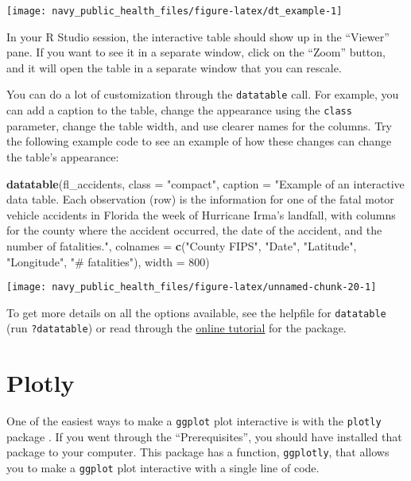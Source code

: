 \documentclass[]{tufte-book}
\newenvironment{Shaded}{}{}
\newcommand{\DataTypeTok}[1]{\textcolor[rgb]{0.56,0.13,0.00}{#1}}
\newcommand{\DecValTok}[1]{\textcolor[rgb]{0.25,0.63,0.44}{#1}}
\newcommand{\KeywordTok}[1]{\textcolor[rgb]{0.00,0.44,0.13}{\textbf{#1}}}
\newcommand{\NormalTok}[1]{#1}
\newcommand{\StringTok}[1]{\textcolor[rgb]{0.25,0.44,0.63}{#1}}
\begin{document}
\texttt{[image: navy\_public\_health\_files/figure-latex/dt\_example-1]}

In your R Studio session, the interactive table should show up
in the ``Viewer'' pane. If you want to see it in a separate window, click on the ``Zoom'' button,
and it will open the table in a separate window that you can rescale.

You can do a lot of customization through the \texttt{datatable} call. For example, you can
add a caption to the table, change the appearance using the \texttt{class} parameter, change the
table width, and
use clearer names for the columns. Try the following example code to see an example of how these
changes can change the table's appearance:

\begin{Shaded}
\begin{Highlighting}[]
\KeywordTok{datatable}\NormalTok{(fl_accidents, }\DataTypeTok{class =} \StringTok{"compact"}\NormalTok{, }\DataTypeTok{caption =} \StringTok{"Example of an interactive data table. Each observation (row) is the information for one of the fatal motor vehicle accidents in Florida the week of Hurricane Irma's landfall, with columns for the county where the accident occurred, the date of the accident, and the number of fatalities."}\NormalTok{, }
    \DataTypeTok{colnames =} \KeywordTok{c}\NormalTok{(}\StringTok{"County FIPS"}\NormalTok{, }\StringTok{"Date"}\NormalTok{, }\StringTok{"Latitude"}\NormalTok{, }
        \StringTok{"Longitude"}\NormalTok{, }\StringTok{"# fatalities"}\NormalTok{), }\DataTypeTok{width =} \DecValTok{800}\NormalTok{)}
\end{Highlighting}
\end{Shaded}

\texttt{[image: navy\_public\_health\_files/figure-latex/unnamed-chunk-20-1]}

To get more details on all the options available, see the helpfile for \texttt{datatable} (run \texttt{?datatable}) or read through the \href{}{online tutorial} for the package.

\hypertarget{plotly}{%
\section{Plotly}\label{plotly}}

One of the easiest ways to make a \texttt{ggplot} plot interactive is with the \texttt{plotly} package \citep{R-plotly}.
If you went through the ``Prerequisites'', you should have installed that package to your
computer. This package has a function, \texttt{ggplotly}, that allows you to make a \texttt{ggplot}
plot interactive with a single line of code.
\end{document}
